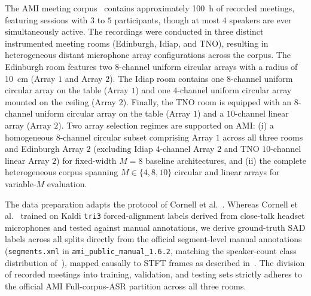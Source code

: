 \documentclass[lettersize,journal]{IEEEtran}
\begin{document}
The \gls{AMI} meeting corpus~\cite{mccowan2005ami} contains approximately \SI{100}{\hour} of recorded meetings,
featuring sessions with $3$ to $5$ participants, though at most $4$ speakers are ever simultaneously active.
The recordings were conducted in three distinct instrumented meeting rooms (Edinburgh, Idiap, and TNO),
resulting in heterogeneous distant microphone array configurations across the corpus.
The Edinburgh room features two $8$-channel uniform circular arrays with a radius of \SI{10}{\centi\meter} (Array $1$ and Array $2$).
The Idiap room contains one $8$-channel uniform circular array on the table (Array $1$)
and one $4$-channel uniform circular array mounted on the ceiling (Array $2$).
Finally, the TNO room is equipped with an $8$-channel uniform circular array on the table (Array $1$)
and a $10$-channel linear array (Array $2$).
Two array selection regimes are supported on \gls{AMI}: (i) a homogeneous $8$-channel circular subset comprising Array $1$ across all three rooms and Edinburgh Array $2$ (excluding Idiap $4$-channel Array $2$ and TNO $10$-channel linear Array $2$) for fixed-width $M=8$ baseline architectures, and (ii) the complete heterogeneous corpus spanning $M \in \{4, 8, 10\}$ circular and linear arrays for variable-$M$ evaluation.

The data preparation adapts the protocol of Cornell et al.~\cite{cornell2022overlapped}.
Whereas Cornell et al.~\cite{cornell2022overlapped} trained on Kaldi \texttt{tri3} forced-alignment labels derived from close-talk headset microphones and tested against manual annotations, we derive ground-truth \gls{SAD} labels across all splits directly from the official segment-level manual annotations (\texttt{segments.xml} in \texttt{ami\_public\_manual\_1.6.2}, matching the speaker-count class distribution of~\cite{cornell2022overlapped}), mapped causally to \gls{STFT} frames as described in~.
The division of recorded meetings into training, validation, and testing sets strictly adheres
to the official \gls{AMI} Full-corpus-ASR partition across all three rooms.
\end{document}
